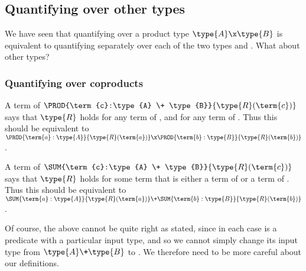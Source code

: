 \newpage
\subsection{Quantifying over other types}

We have seen that quantifying over a product type $\type{A} \x \type{B}$ is equivalent to quantifying separately over each of the two types  and .  What about other types?

\subsubsection{Quantifying over coproducts}

A term of 
$\PROD{\term{c}:\type{A} \+ \type{B}}{\type{R}(\term{c})}$
says that $\type{R}$ holds for any term of , and for any term of .  Thus this should be equivalent to 
$\PROD{\term{a}:\type{A}}{\type{R}(\term{a})} \x
\PROD{\term{b}:\type{B}}{\type{R}(\term{b})}$.

A term of 
$\SUM{\term{c}:\type{A} \+ \type{B}}{\type{R}(\term{c})}$
says that $\type{R}$ holds for some term that is either a term of  or a term of .  Thus this should be equivalent to 
$\SUM{\term{a}:\type{A}}{\type{R}(\term{a})} \+
\SUM{\term{b}:\type{B}}{\type{R}(\term{b})}$.

Of course, the above cannot be quite right as stated, since in each case  is a predicate with a particular input type, and so we cannot simply change its input type from $\type{A} \+ \type{B}$ to .  We therefore need to be more careful about our definitions.
